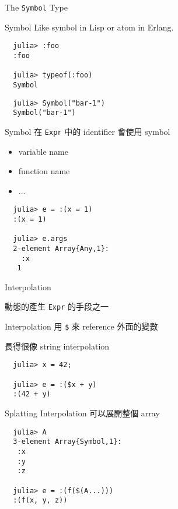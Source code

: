 \documentclass[14pt]{beamer}
\begin{document}
\begin{frame}[c]{}
  \centering
  \Large
  The \texttt{Symbol} Type
\end{frame}


\begin{frame}[fragile]{Symbol}
  Like symbol in Lisp or atom in Erlang.

\begin{lstlisting}
  julia> :foo
  :foo

  julia> typeof(:foo)
  Symbol
\end{lstlisting}

  \pause

\begin{lstlisting}
  julia> Symbol("bar-1")
  Symbol("bar-1")
\end{lstlisting}
\end{frame}


\begin{frame}[fragile]{Symbol}
  在 \texttt{Expr} 中的 identifier 會使用 symbol
  \begin{itemize}
    \item variable name
    \item function name
    \item ...
  \end{itemize}

  \pause
\begin{lstlisting}
  julia> e = :(x = 1)
  :(x = 1)

  julia> e.args
  2-element Array{Any,1}:
    :x
   1
\end{lstlisting}
\end{frame}


\begin{frame}[c]{}
  \centering
  \Large
  Interpolation

  \large
  動態的產生 \texttt{Expr} 的手段之一
\end{frame}


\begin{frame}[fragile]{Interpolation}
  用 \texttt{\$} 來 reference 外面的變數

  長得很像 string interpolation

\begin{lstlisting}
  julia> x = 42;

  julia> e = :($x + y)
  :(42 + y)
\end{lstlisting}
\end{frame}


\begin{frame}[fragile]{Splatting Interpolation}
  可以展開整個 array

\begin{lstlisting}
  julia> A
  3-element Array{Symbol,1}:
   :x
   :y
   :z

  julia> e = :(f($(A...)))
  :(f(x, y, z))
\end{lstlisting}
\end{frame}
\end{document}
